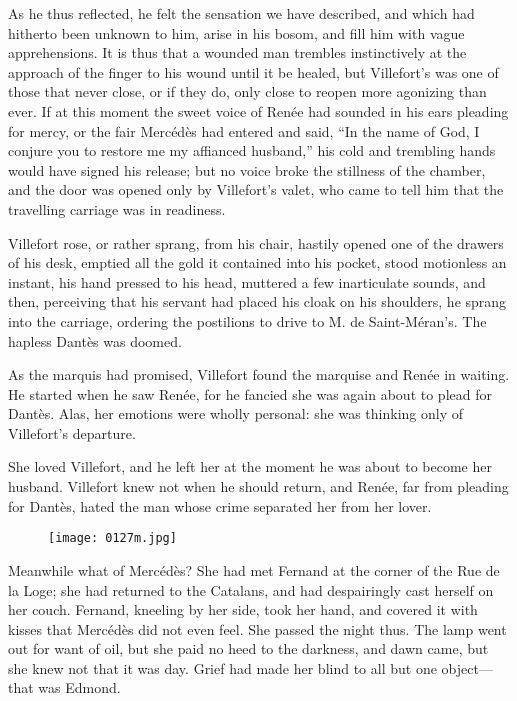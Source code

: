 As he thus reflected, he felt the sensation we have described, and
which had hitherto been unknown to him, arise in his bosom, and fill
him with vague apprehensions. It is thus that a wounded man trembles
instinctively at the approach of the finger to his wound until it be
healed, but Villefort’s was one of those that never close, or if they
do, only close to reopen more agonizing than ever. If at this moment
the sweet voice of Renée had sounded in his ears pleading for mercy, or
the fair Mercédès had entered and said, “In the name of God, I conjure
you to restore me my affianced husband,” his cold and trembling hands
would have signed his release; but no voice broke the stillness of the
chamber, and the door was opened only by Villefort’s valet, who came to
tell him that the travelling carriage was in readiness.

Villefort rose, or rather sprang, from his chair, hastily opened one of
the drawers of his desk, emptied all the gold it contained into his
pocket, stood motionless an instant, his hand pressed to his head,
muttered a few inarticulate sounds, and then, perceiving that his
servant had placed his cloak on his shoulders, he sprang into the
carriage, ordering the postilions to drive to M. de Saint-Méran’s. The
hapless Dantès was doomed.

As the marquis had promised, Villefort found the marquise and Renée in
waiting. He started when he saw Renée, for he fancied she was again
about to plead for Dantès. Alas, her emotions were wholly personal: she
was thinking only of Villefort’s departure.

She loved Villefort, and he left her at the moment he was about to
become her husband. Villefort knew not when he should return, and
Renée, far from pleading for Dantès, hated the man whose crime
separated her from her lover.

\begin{figure}[ht]
\texttt{[image: 0127m.jpg]}
\end{figure}

Meanwhile what of Mercédès? She had met Fernand at the corner of the
Rue de la Loge; she had returned to the Catalans, and had despairingly
cast herself on her couch. Fernand, kneeling by her side, took her
hand, and covered it with kisses that Mercédès did not even feel. She
passed the night thus. The lamp went out for want of oil, but she paid
no heed to the darkness, and dawn came, but she knew not that it was
day. Grief had made her blind to all but one object—that was Edmond.

